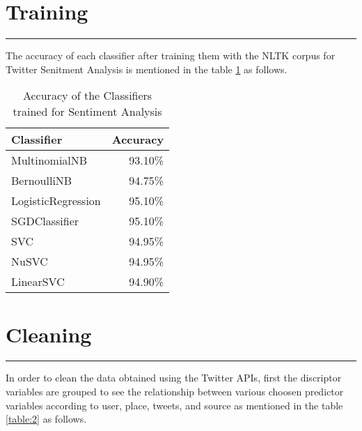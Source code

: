\documentclass[a4paper,12pt, notitlepage]{article}
\begin{document}
\section{Training}
\rule{\textwidth}{0.5pt}
\par
The accuracy of each classifier after training them with the NLTK corpus for Twitter Senitment Analysis is mentioned in the table \ref{table:1} as follows.

\begin{table}[!htbp]
\centering
\begin{tabular}{ |l|r| }
\hline \rowcolor{Gray}
Classifier & Accuracy   \\[1ex]
\hline
MultinomialNB & 93.10\%   \\[1ex]
BernoulliNB & 94.75\%  \\[1ex]
LogisticRegression & 95.10\% \\[1ex]
SGDClassifier & 95.10\% \\[1ex]
SVC & 94.95\% \\[1ex]
NuSVC & 94.95\% \\[1ex]
LinearSVC & 94.90\% \\[1ex]
\hline
\end{tabular}
\caption{Accuracy of the Classifiers trained for Sentiment Analysis}
\label{table:1}
\end{table}

\section{Cleaning}
\rule{\textwidth}{0.5pt}
\par
In order to clean the data obtained using the Twitter APIs, first the discriptor variables are grouped to see the relationship between various choosen predictor variables according to user, place, tweets, and source as mentioned in the table \ref{table:2} as follows.
\end{document}
